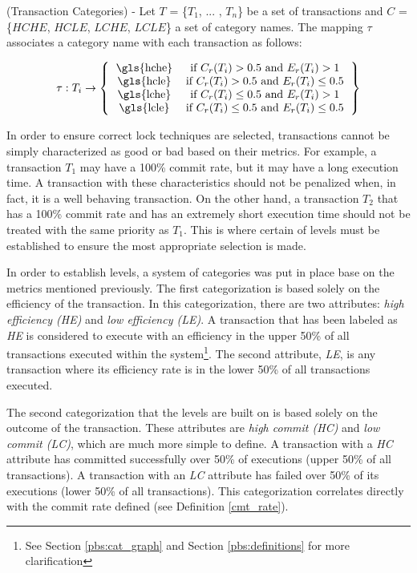 \begin{definition}
\label{transaction_categories}
(Transaction Categories) - Let $T$ = \{$T_{1}$, ... , $T_{n}$\} be a set of transactions and $C$ = \{$HCHE$, $HCLE$, $LCHE$, $LCLE$\} a set of category names. The mapping $\tau$ associates a category name with each transaction as follows:

\[ 
\tau : \textrm{$T_{i}$}\rightarrow
\left \{
  \begin{tabular}{cc}
  \gls{hche} & if $C_{r}(T_{i}) > 0.5$ and $E_{r}(T_{i}) > 1$ \\
  \gls{hcle} & if $C_{r}(T_{i}) > 0.5$ and $E_{r}(T_{i}) \le 0.5$ \\
  \gls{lche} & if $C_{r}(T_{i}) \le 0.5$ and $E_{r}(T_{i}) > 1$ \\
  \gls{lcle} & if $C_{r}(T_{i}) \le 0.5$ and $E_{r}(T_{i}) \le 0.5$
  \end{tabular}
\right \}
\]

{\normalfont In order to ensure correct lock techniques are selected, transactions cannot be simply characterized as good or bad based on their metrics. For example, a transaction $T_{1}$ may have a 100\% commit rate, but it may have a long execution time. A transaction with these characteristics should not be penalized when, in fact, it is a well behaving transaction. On the other hand, a transaction $T_{2}$ that has a 100\% commit rate and has an extremely short execution time should not be treated with the same priority as $T_{1}$. This is where certain of levels must be established to ensure the most appropriate selection is made.

In order to establish levels, a system of categories was put in place base on the metrics mentioned previously. The first categorization is based solely on the efficiency of the transaction. In this categorization, there are two attributes: \textit{high efficiency (HE)} and \textit{low efficiency (LE)}. A transaction that has been labeled as \textit{HE} is considered to execute with an efficiency in the upper 50\% of all transactions executed within the system\footnote{See Section \ref{pbs:cat_graph} and Section \ref{pbs:definitions} for more clarification}. The second attribute, \textit{LE}, is any transaction where its efficiency rate is in the lower 50\% of all transactions executed.

The second categorization that the levels are built on is based solely on the outcome of the transaction. These attributes are \textit{high commit (HC)} and \textit{low commit (LC)}, which are much more simple to define. A transaction with a \textit{HC} attribute has committed successfully over 50\% of executions (upper 50\% of all transactions). A transaction with an \textit{LC} attribute has failed over 50\% of its executions (lower 50\% of all transactions). This categorization correlates directly with the commit rate defined (see Definition \ref{cmt_rate}).

}
\end{definition}
